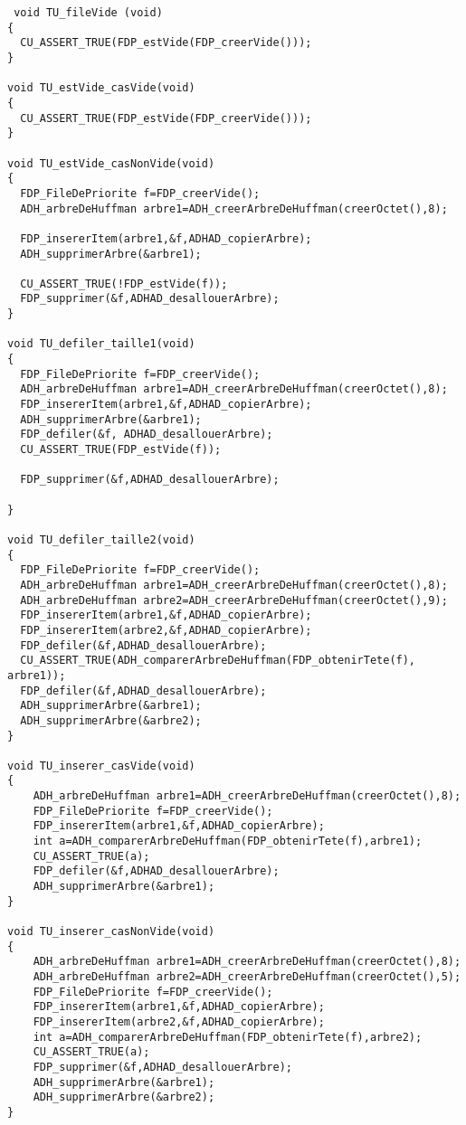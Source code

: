 \begin{verbatim}
 void TU_fileVide (void)
{
  CU_ASSERT_TRUE(FDP_estVide(FDP_creerVide()));
}

void TU_estVide_casVide(void)
{
  CU_ASSERT_TRUE(FDP_estVide(FDP_creerVide()));
}

void TU_estVide_casNonVide(void)
{
  FDP_FileDePriorite f=FDP_creerVide();
  ADH_arbreDeHuffman arbre1=ADH_creerArbreDeHuffman(creerOctet(),8);
  
  FDP_insererItem(arbre1,&f,ADHAD_copierArbre);
  ADH_supprimerArbre(&arbre1);
  
  CU_ASSERT_TRUE(!FDP_estVide(f));
  FDP_supprimer(&f,ADHAD_desallouerArbre);
}

void TU_defiler_taille1(void)
{
  FDP_FileDePriorite f=FDP_creerVide();
  ADH_arbreDeHuffman arbre1=ADH_creerArbreDeHuffman(creerOctet(),8);
  FDP_insererItem(arbre1,&f,ADHAD_copierArbre);
  ADH_supprimerArbre(&arbre1);
  FDP_defiler(&f, ADHAD_desallouerArbre);
  CU_ASSERT_TRUE(FDP_estVide(f));
  
  FDP_supprimer(&f,ADHAD_desallouerArbre);
  
}

void TU_defiler_taille2(void)
{
  FDP_FileDePriorite f=FDP_creerVide();
  ADH_arbreDeHuffman arbre1=ADH_creerArbreDeHuffman(creerOctet(),8);
  ADH_arbreDeHuffman arbre2=ADH_creerArbreDeHuffman(creerOctet(),9);
  FDP_insererItem(arbre1,&f,ADHAD_copierArbre);
  FDP_insererItem(arbre2,&f,ADHAD_copierArbre);
  FDP_defiler(&f,ADHAD_desallouerArbre);
  CU_ASSERT_TRUE(ADH_comparerArbreDeHuffman(FDP_obtenirTete(f), arbre1));
  FDP_defiler(&f,ADHAD_desallouerArbre);
  ADH_supprimerArbre(&arbre1);
  ADH_supprimerArbre(&arbre2);
}

void TU_inserer_casVide(void)
{
	ADH_arbreDeHuffman arbre1=ADH_creerArbreDeHuffman(creerOctet(),8);
	FDP_FileDePriorite f=FDP_creerVide();
  	FDP_insererItem(arbre1,&f,ADHAD_copierArbre);
	int a=ADH_comparerArbreDeHuffman(FDP_obtenirTete(f),arbre1);
	CU_ASSERT_TRUE(a);
	FDP_defiler(&f,ADHAD_desallouerArbre);
	ADH_supprimerArbre(&arbre1);
}

void TU_inserer_casNonVide(void)
{
	ADH_arbreDeHuffman arbre1=ADH_creerArbreDeHuffman(creerOctet(),8);
	ADH_arbreDeHuffman arbre2=ADH_creerArbreDeHuffman(creerOctet(),5);
	FDP_FileDePriorite f=FDP_creerVide();
  	FDP_insererItem(arbre1,&f,ADHAD_copierArbre);
  	FDP_insererItem(arbre2,&f,ADHAD_copierArbre);
	int a=ADH_comparerArbreDeHuffman(FDP_obtenirTete(f),arbre2);
	CU_ASSERT_TRUE(a);
	FDP_supprimer(&f,ADHAD_desallouerArbre);
	ADH_supprimerArbre(&arbre1);
	ADH_supprimerArbre(&arbre2);
}


\end{verbatim}

